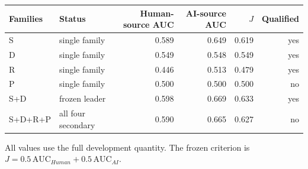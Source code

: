 \begin{tabular}{llrrrr}
\toprule
Families & Status & Human-source AUC & AI-source AUC & $J$ & Qualified \\
\midrule
S & single family & 0.589 & 0.649 & 0.619 & yes \\
D & single family & 0.549 & 0.548 & 0.549 & yes \\
R & single family & 0.446 & 0.513 & 0.479 & yes \\
P & single family & 0.500 & 0.500 & 0.500 & no \\
S+D & frozen leader & 0.598 & 0.669 & 0.633 & yes \\
S+D+R+P & all four secondary & 0.590 & 0.665 & 0.627 & no \\
\bottomrule
\end{tabular}
\par\smallskip
{\footnotesize All values use the full development quantity. The frozen criterion is $J=0.5\,\mathrm{AUC}_{Human}+0.5\,\mathrm{AUC}_{AI}$.}
